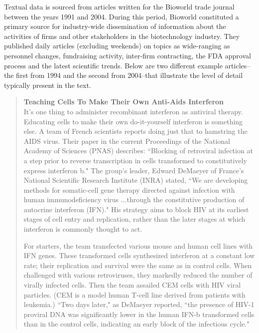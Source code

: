 Textual data is sourced from articles written for the Bioworld trade journal between the years 1991 and 2004. During this period, Bioworld constituted a primary source for industry-wide dissemination of information about the activities of firms and other stakeholders in the biotechnology industry. They published daily articles (excluding weekends) on topics as wide-ranging as personnel changes, fundraising activity, inter-firm contracting, the FDA approval process and the latest scientific trends. Below are two different example articles--the first from 1994 and the second from 2004--that illustrate the level of detail typically present in the text.

\begin{singlespace}
\begin{small}
\begin{quotation}
\noindent \textbf{Teaching Cells To Make Their Own Anti-Aids Interferon} \\

It's one thing to administer recombinant interferon as antiviral therapy. Educating cells to make their own do-it-yourself interferon is something else. A team of French scientists reports doing just that to hamstring the AIDS virus. Their paper in the current Proceedings of the National Academy of Sciences (PNAS) describes: ``Blocking of retroviral infection at a step prior to reverse transcription in cells transformed to constitutively express interferon b." The group's leader, Edward DeMaeyer of France's National Scientific Research Institute (INRA) stated, ``We are developing methods for somatic-cell gene therapy directed against infection with human immunodeficiency virus ...through the constitutive production of autocrine interferon (IFN)." His strategy aims to block HIV at its earliest stages of cell entry and replication, rather than the later stages at which interferon is commonly thought to act.

For starters, the team transfected various mouse and human cell lines with IFN genes. These transformed cells synthesized interferon at a constant low rate; their replication and survival were the same as in control cells. When challenged with various retroviruses, they markedly reduced the number of virally infected cells. Then the team assailed CEM cells with HIV viral particles. (CEM is a model human T-cell line derived from patients with leukemia.) ``Two days later," as DeMaeyer reported, ``the presence of HIV-1 proviral DNA was significantly lower in the human IFN-b transformed cells than in the control cells, indicating an early block of the infectious cycle."


\end{quotation}
\end{small}
\end{singlespace}
